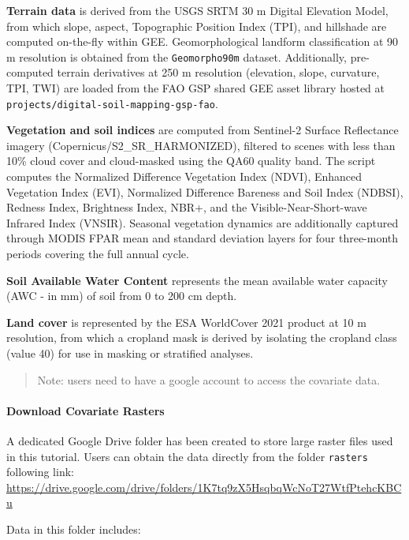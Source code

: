 \documentclass[
  10pt,
  b5paper,
  oneside]{book}
\begin{document}
\textbf{Terrain data} is derived from the USGS SRTM 30 m Digital Elevation Model, from which slope, aspect, Topographic Position Index (TPI), and hillshade are computed on-the-fly within GEE. Geomorphological landform classification at 90 m resolution is obtained from the \texttt{Geomorpho90m} dataset. Additionally, pre-computed terrain derivatives at 250 m resolution (elevation, slope, curvature, TPI, TWI) are loaded from the FAO GSP shared GEE asset library hosted at \texttt{projects/digital-soil-mapping-gsp-fao}.

\textbf{Vegetation and soil indices} are computed from Sentinel-2 Surface Reflectance imagery (Copernicus/S2\_SR\_HARMONIZED), filtered to scenes with less than 10\% cloud cover and cloud-masked using the QA60 quality band. The script computes the Normalized Difference Vegetation Index (NDVI), Enhanced Vegetation Index (EVI), Normalized Difference Bareness and Soil Index (NDBSI), Redness Index, Brightness Index, NBR+, and the Visible-Near-Short-wave Infrared Index (VNSIR). Seasonal vegetation dynamics are additionally captured through MODIS FPAR mean and standard deviation layers for four three-month periods covering the full annual cycle.

\textbf{Soil Available Water Content} represents the mean available water capacity (AWC - in mm) of soil from 0 to 200 cm depth.

\textbf{Land cover} is represented by the ESA WorldCover 2021 product at 10 m resolution, from which a cropland mask is derived by isolating the cropland class (value 40) for use in masking or stratified analyses.

\begin{quote}
Note: users need to have a google account to access the covariate data.
\end{quote}

\paragraph*{Download Covariate Rasters}\label{download-covariate-rasters}

A dedicated Google Drive folder has been created to store large raster files used in this tutorial. Users can obtain the data directly from the folder \texttt{rasters} following link:
\url{https://drive.google.com/drive/folders/1K7tq9zX5HsqbqWcNoT27WtfPtehcKBCu}

Data in this folder includes:
\end{document}
